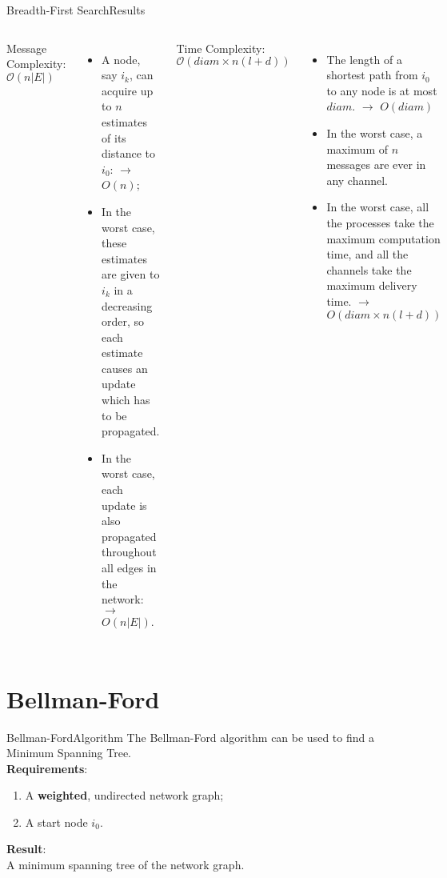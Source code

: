 \documentclass[pdf]{beamer}
\begin{document}
\begin{frame}{Breadth-First Search}{Results}
    \begin{columns}
            Message Complexity: \\
            \hspace*{\parindent} $\mathcal{O}(n|E|)$ \\
            \pause
            \small
            \begin{itemize}
                \item A node, say $i_k$, can acquire up to $n$ estimates of its distance to $i_0$: $\to$ $O(n)$;
                \item In the worst case, these estimates are given to $i_k$ in a decreasing order, so each estimate causes an update which has to be propagated.
                \item In the worst case, each update is also propagated throughout all edges in the network: $\to$ $O(n|E|)$.
            \end{itemize}
        \pause
            \normalsize
            Time Complexity:
            \hspace*{\parindent} $\mathcal{O}(diam \times n(l + d))$ \\
            \pause
            \small
            \begin{itemize}
                \item The length of a shortest path from $i_0$ to any node is at most $diam$. $\to$ $O(diam)$
                \item In the worst case, a maximum of $n$ messages are ever in any channel.
                \item In the worst case, all the processes take the maximum computation time, and all the channels take the maximum delivery time. $\to$ $O(diam \times n(l +d))$\\ 
            \end{itemize}           
    \end{columns} 
\end{frame}

\section{Bellman-Ford}
\begin{frame}{Bellman-Ford}{Algorithm}
    \normalsize
	The Bellman-Ford algorithm can be used to find a Minimum Spanning Tree. \\
    \vspace{12pt}
    \pause
    \textbf{Requirements}:
    \begin{enumerate}
        \item A \textbf{weighted}, undirected network graph;
        \item A start node $i_0$. 
    \end{enumerate}
    \pause
    \vspace{12pt}
    \textbf{Result}: \\
    A minimum spanning tree of the network graph.
\end{frame}
\end{document}
